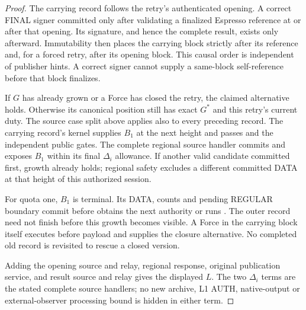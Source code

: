 \begin{proof}
The carrying record follows the retry's authenticated opening. A
correct FINAL signer committed only after validating a finalized
Espresso reference at or after that opening. Its signature, and hence
the complete result, exists only afterward. Immutability then places
the carrying block strictly after its reference and, for a forced retry,
after its opening block. This causal order is independent of publisher
hints. A correct signer cannot supply a same-block self-reference before
that block finalizes.

If $G$ has already grown or a Force has closed the retry, the claimed
alternative holds. Otherwise its canonical position still has exact
$G^*$ and this retry's current duty. The source case split above applies
also to every preceding record. The carrying record's kernel supplies
$B_1$ at the next height and passes  and the independent
public gates. The complete regional source handler commits and exposes
$B_1$ within its final $\Delta_i$ allowance. If another valid candidate
committed first, growth already holds; regional safety excludes a
different committed DATA at that height of this authorized session.

For quota one, $B_1$ is terminal. Its DATA, counts and pending REGULAR
boundary commit before  obtains the next authority
or runs . The outer record need not finish before this
growth becomes visible. A Force in the carrying block itself executes
before payload and supplies the closure alternative. No completed old
record is revisited to rescue a closed version.

Adding the opening source and relay, regional response, original
publication service, and result source and relay gives the displayed
$L$. The two $\Delta_i$ terms are the stated complete source handlers;
no new archive, L1 AUTH, native-output or external-observer processing
bound is hidden in either term.
\end{proof}

